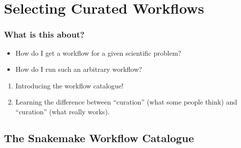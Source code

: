 \section{Selecting Curated Workflows}
{   
}


\begin{frame}
  \frametitle{What is this about?}
   \begin{question}[Questions]
   	 \begin{itemize}
       \item How do I get a workflow for a given scientific problem?
       \item How do I run such an arbitrary workflow?
     \end{itemize}
   \end{question} 
   \begin{docs}[Objectives]
   	  \begin{enumerate}
                      \item Introducing the workflow catalogue!
                      \item Learning the difference between ``curation'' (what some people think) and ``curation'' (what really works).
      \end{enumerate}
    \end{docs}
\end{frame}  

\subsection{The Snakemake Workflow Catalogue}

